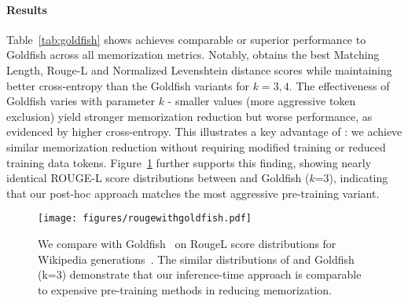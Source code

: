 \paragraph{Results} Table~\ref{tab:goldfish} shows \sys achieves comparable or superior performance to Goldfish across all memorization metrics. Notably, \sys obtains the best Matching Length, Rouge-L and Normalized Levenshtein distance scores while maintaining better cross-entropy than the Goldfish variants for \(k = 3,4\). The effectiveness of Goldfish varies with parameter $k$ - smaller values (more aggressive token exclusion) yield stronger memorization reduction but worse performance, as evidenced by higher cross-entropy. This illustrates a key advantage of \sys: we achieve similar memorization reduction without requiring modified training or reduced training data tokens. Figure~\ref{fig:rougelwithgoldfish} further supports this finding, showing nearly identical ROUGE-L score distributions between \sys and Goldfish ($k$=3), indicating that our post-hoc approach matches the most aggressive pre-training variant.


\begin{figure}[t]
    \centering
    \texttt{[image: figures/rougewithgoldfish.pdf]}
    \caption{We compare \sys with Goldfish~\citep{hans2024like} on RougeL score distributions for Wikipedia generations~\citep{bridge2001wikipedia}. The similar distributions of \sys and Goldfish (k=3) demonstrate that our inference-time approach is comparable to expensive pre-training methods in reducing memorization. }
    \label{fig:rougelwithgoldfish}
\end{figure}
